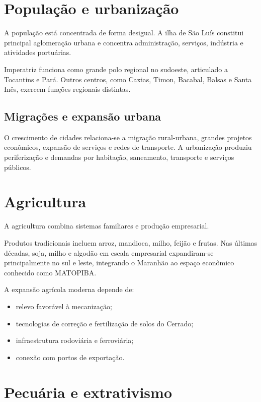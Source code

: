 \section{População e urbanização}

A população está concentrada de forma desigual. A ilha de São Luís constitui principal aglomeração urbana e concentra administração, serviços, indústria e atividades portuárias.

Imperatriz funciona como grande polo regional no sudoeste, articulado a Tocantins e Pará. Outros centros, como Caxias, Timon, Bacabal, Balsas e Santa Inês, exercem funções regionais distintas.

\subsection{Migrações e expansão urbana}

O crescimento de cidades relaciona-se a migração rural-urbana, grandes projetos econômicos, expansão de serviços e redes de transporte. A urbanização produziu periferização e demandas por habitação, saneamento, transporte e serviços públicos.

\section{Agricultura}

A agricultura combina sistemas familiares e produção empresarial.

Produtos tradicionais incluem arroz, mandioca, milho, feijão e frutas. Nas últimas décadas, soja, milho e algodão em escala empresarial expandiram-se principalmente no sul e leste, integrando o Maranhão ao espaço econômico conhecido como MATOPIBA.

A expansão agrícola moderna depende de:
\begin{itemize}
\item relevo favorável à mecanização;
\item tecnologias de correção e fertilização de solos do Cerrado;
\item infraestrutura rodoviária e ferroviária;
\item conexão com portos de exportação.
\end{itemize}

\section{Pecuária e extrativismo}

